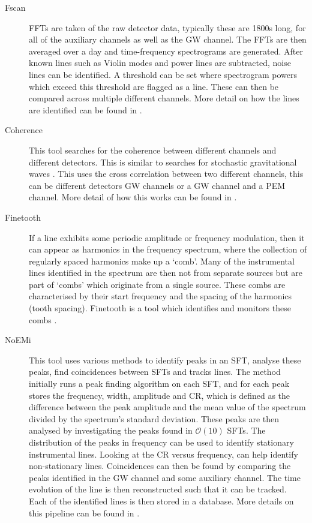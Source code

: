 \begin{description}
	\item[Fscan] \Glspl{FFT} are taken of the raw detector data, typically these are 1800s long, for all of the auxiliary channels as well as the \gls{GW} channel.
	The \glspl{FFT} are then averaged over a day and time-frequency spectrograms
	are generated. After known lines such as Violin modes and power lines are
	subtracted, noise lines can be identified. A threshold can be set where spectrogram powers which exceed this threshold are flagged as a line. These
	can then be compared across multiple different channels. More detail on how the
	lines are identified can be found in \citep{coughlin2010NoiseLine}.
	
    \item[Coherence] This tool searches for the coherence between different
	channels and different detectors. This is similar to searches for stochastic
	gravitational waves \citep{allen1999DetectingStochastic}. This uses the cross correlation between two different channels, this can be different detectors \gls{GW} channels or a \gls{GW} channel and a \gls{PEM} channel. More detail of how this works can be found in
	\citep{covas2018IdentificationMitigation}.~
	
	\item[Finetooth] If a line exhibits some periodic amplitude or frequency modulation, then it can appear as harmonics in the frequency spectrum, where the collection of regularly spaced harmonics make up a `comb'. 
	Many of the instrumental lines identified in the spectrum are then not from separate sources but are part of `combs' which originate from a single source. 
	These combs are characterised by their start frequency and the spacing of the harmonics (tooth spacing).
	Finetooth is a tool which identifies and monitors these combs \citep{neunzertDailyComb}.

	
	\item[\Gls{NoEMi}] This tool uses various methods to identify peaks in an \gls{SFT}, analyse these peaks, find coincidences between \glspl{SFT} and tracks lines. 
	The method initially runs a peak finding algorithm on each \gls{SFT}, and for each peak stores the frequency, width, amplitude and \gls{CR}, which is defined as the difference between the peak amplitude and the mean value of the spectrum divided by the spectrum's standard deviation.
	These peaks are then analysed by investigating the peaks found in $\mathcal{O}(10)$ \glspl{SFT}. 
	The distribution of the peaks in frequency can be used to identify stationary instrumental lines. 
	Looking at the \gls{CR} versus frequency, can help identify non-stationary lines.
	Coincidences can then be found by comparing the peaks identified in the \gls{GW} channel and some auxiliary channel. 
	The time evolution of the line is then reconstructed such that it can be tracked.
	Each of the identified lines is then stored in a database.
	More details on this pipeline can be found in \citep{accadia2012NoEMiNoise}.

	
\end{description}


